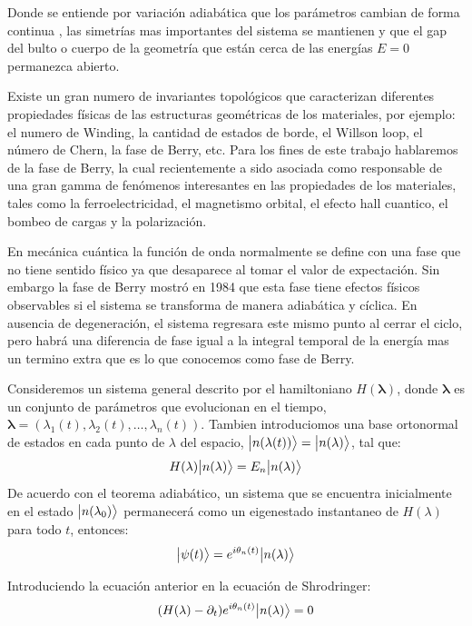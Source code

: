 Donde se entiende por variación adiabática que los parámetros cambian de forma continua , las simetrías mas importantes del sistema se mantienen y que el gap del bulto o cuerpo de la geometría que están cerca de las energías $E=0$ permanezca abierto.

Existe un gran numero de invariantes topológicos que caracterizan diferentes propiedades físicas de las estructuras geométricas de los materiales, por ejemplo: el numero de Winding, la cantidad de estados de borde, el Willson loop, el número de Chern, la fase de Berry, etc. Para los fines de este trabajo hablaremos de la fase de Berry, la cual recientemente a sido asociada como responsable de una gran gamma de fenómenos interesantes en las propiedades de los materiales, tales como la ferroelectricidad, el magnetismo orbital, el efecto hall cuantico, el bombeo de cargas y la polarización.

En mecánica cuántica la función de onda normalmente se define con una fase que no tiene sentido físico ya que desaparece al tomar el valor de expectación. Sin embargo la fase de Berry mostró en 1984 que esta fase tiene efectos físicos observables si el sistema se transforma de manera adiabática y cíclica. En ausencia de degeneración, el sistema regresara este mismo punto al cerrar el ciclo, pero habrá una diferencia de fase igual a la integral temporal de la energía mas un termino extra que es lo que conocemos como fase de Berry.

Consideremos un sistema general descrito por el hamiltoniano $H(\mathbf{\lambda})$, donde $\mathbf{\lambda}$ es un conjunto de parámetros que evolucionan en el tiempo, $\mathbf{\lambda} = \left( \lambda_1(t), \lambda_2(t),\dots, \lambda_n(t)\right)$. Tambien introduciomos una base ortonormal de estados en cada punto de $\lambda$ del espacio, $\big |{n(\lambda(t))}\big \rangle = \big |{n(\lambda)}\big \rangle$, tal que:
\begin{equation}
    H(\lambda) \big |{n(\lambda)}\big \rangle =  E_n\big |{n(\lambda)}\big \rangle
\end{equation}
De acuerdo con el teorema adiabático, un sistema que se encuentra inicialmente en el estado $\big |{n(\lambda_0)}\big \rangle$ permanecerá como un eigenestado instantaneo de $H(\lambda)$ para todo $t$, entonces:
\begin{align}
    \big |{\psi(t)}\big \rangle =  e^{i\theta_n(t)}\big |{n(\lambda)}\big \rangle
\end{align}

Introduciendo la ecuación anterior en la ecuación de Shrodringer:
\begin{align}
    (H(\lambda) - \partial_t) e^{i\theta_n(t)}\big |{n(\lambda)}\big \rangle =  0
\end{align}

